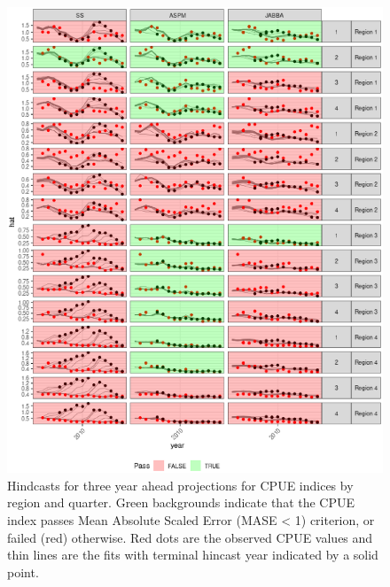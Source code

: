 \documentclass[12pt,halfline,a4paper,nonumbib]{ouparticle}
\begin{document}
\begin{figure}[htbp]
\centering
\includegraphics[width=6in]{fig5.eps}
\caption{Hindcasts for three year ahead projections for CPUE indices by region and quarter. Green backgrounds indicate that the CPUE index passes Mean Absolute Scaled Error (MASE < 1) criterion, or failed (red) otherwise. Red dots are the observed CPUE values and thin lines are the fits with terminal hincast year indicated by a solid point.}
\label{fig:hy3}
\end{figure}
\end{document}
